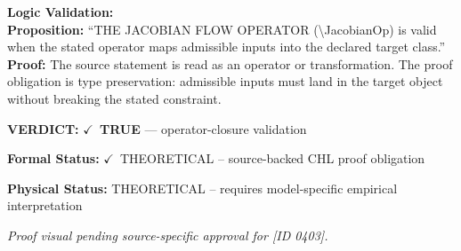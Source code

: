 \textbf{Logic Validation:}\\
\textbf{Proposition:} ``THE JACOBIAN FLOW OPERATOR (\textbackslash{}JacobianOp) is valid when the stated operator maps
admissible inputs into the declared target class.''\\
\textbf{Proof:} The source statement is read as an operator or transformation. The proof obligation is
type preservation: admissible inputs must land in the target object without breaking the
stated constraint.

\textbf{VERDICT:} \ensuremath{\checkmark}\ \textbf{TRUE} --- operator-closure validation

\textbf{Formal Status:} \ensuremath{\checkmark}\ THEORETICAL -- source-backed CHL proof obligation

\textbf{Physical Status:} THEORETICAL -- requires model-specific empirical interpretation
\par\vspace{0.45em}
\par
\vfill
\begingroup\footnotesize\itshape
Proof visual pending source-specific approval for [ID 0403].
\par\endgroup
\vfill
\endgroup
\endgroup

